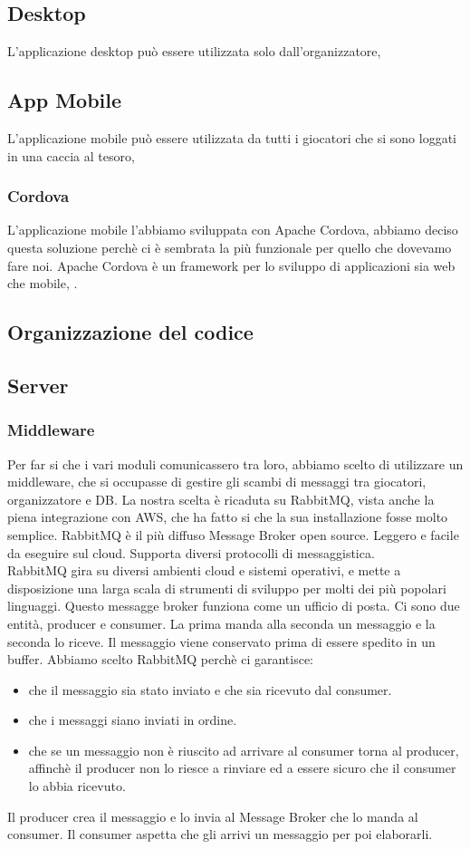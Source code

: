 \documentclass[12pt, italian]{article}
\begin{document}
\subsection{Desktop}
L'applicazione desktop può essere utilizzata solo dall'organizzatore, 
\subsection{App Mobile}
L'applicazione mobile può essere utilizzata da tutti i giocatori che si sono loggati in una caccia al tesoro,
\subsubsection{Cordova}
L'applicazione mobile l'abbiamo sviluppata con Apache Cordova, abbiamo deciso questa soluzione perchè ci è sembrata la più funzionale per quello che dovevamo fare noi. Apache Cordova è un framework per lo sviluppo di applicazioni sia web che mobile, .
\subsection{Organizzazione del codice}

\subsection{Server}
\subsubsection{Middleware}
Per far si che i vari moduli comunicassero tra loro, abbiamo scelto di utilizzare un middleware, che si occupasse di gestire gli scambi di messaggi tra giocatori, organizzatore e DB. La nostra scelta è ricaduta su RabbitMQ, vista anche la piena integrazione con AWS, che ha fatto si che la sua installazione fosse molto semplice.
RabbitMQ è il più diffuso Message Broker open source. Leggero e facile da eseguire sul cloud. Supporta diversi protocolli di messaggistica. \\
RabbitMQ gira su diversi ambienti cloud e sistemi operativi, e mette a disposizione una larga scala di strumenti di sviluppo per molti dei più popolari linguaggi.
Questo messagge broker funziona come un ufficio di posta. Ci sono due entità, producer e consumer. La prima manda alla seconda un messaggio e la seconda lo riceve. Il messaggio viene conservato prima di essere spedito in un buffer. Abbiamo scelto RabbitMQ perchè ci garantisce:
\begin{itemize}
	\item che il messaggio sia stato inviato e che sia ricevuto dal consumer.
	\item che i messaggi siano inviati in ordine.
	\item che se un messaggio non è riuscito ad arrivare al consumer torna al producer, affinchè il producer non lo riesce a rinviare ed a essere sicuro che il consumer lo abbia ricevuto.
\end{itemize}
Il producer crea il messaggio e lo invia al Message Broker che lo manda al consumer. Il consumer aspetta che gli arrivi un messaggio per poi elaborarli.
\end{document}
